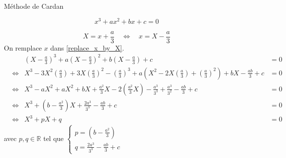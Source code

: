 \documentclass[]{../templates/homework}
\newcommand{\poly}[4]{\ensuremath{#1x^3 + #2x^2 + #3x + #4}}
\newcommand{\dmpoly}[2]{\ensuremath{#1^3 - 3#1^2#2 + 3#1#2^2 - #2^3}}
\newcommand{\dmpolytwo}[2]{\ensuremath{#1^2 - 2#1#2 + #2^2}}
\begin{document}
	
 {Méthode de Cardan}

\begin{equation}
	\tag{$E_0$}
	\poly{}{a}{b}{c} = 0
	\label{replace_x_by_X}
\end{equation}

\subproblem

\begin{equation*}
	X = x + \frac{a}{3} \quad \Leftrightarrow \quad x = X - \frac{a}{3}
\end{equation*}
On remplace $x$ dans \eqref{replace_x_by_X}.
\begin{align*}
	&& (X-\frac{a}{3})^3 + a(X-\frac{a}{3})^2 + b(X-\frac{a}{3}) + c &= 0 \\
	&\Leftrightarrow &\dmpoly{X}{(\frac{a}{3})} + a(\dmpolytwo{X}{(\frac{a}{3})}) + bX - \frac{ab}{3} + c &= 0 \\
	&\Leftrightarrow &X^3 - aX^2 + aX^2 + bX +\frac{a^2}{3}X - 2(\frac{a^2}{3}X) - \frac{a^3}{3^3} + \frac{a^3}{3^2} - \frac{ab}{3} + c &= 0 \\
	&\Leftrightarrow &X^3 + (b - \frac{a^2}{3})X + \frac{2a^3}{3^3} - \frac{ab}{3} + c &= 0 \\
	&\Leftrightarrow &X^3 + pX + q &= 0
\end{align*}
avec $p, q \in \mathbb{R}$ tel que
$\left\{
	\begin{array}{ll}
		p = (b - \frac{a^2}{3})\\
		q = \frac{2a^3}{3^3} - \frac{ab}{3} + c
	\end{array}
\right.$

\subproblem
\end{document}
